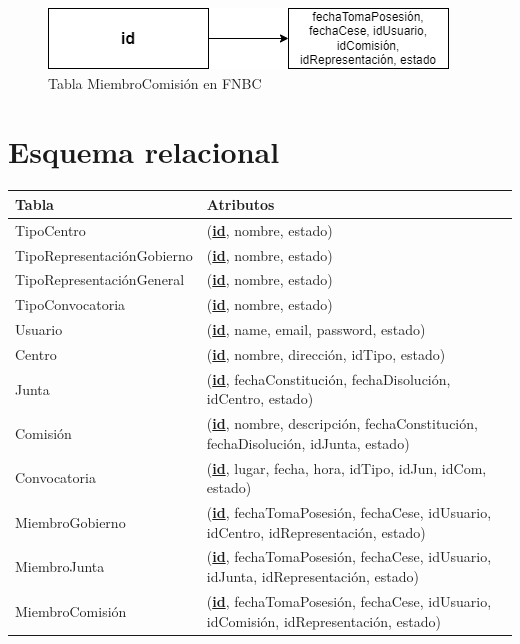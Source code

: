 \begin{figure}[H]
\centering
\includegraphics[scale=0.75]{img/diagramas/Datos/FNBC-MiembroComisión.png}
\caption{Tabla MiembroComisión en FNBC}\label{fig:Tabla MiembroComisión en FNBC}   
\end{figure}

 \section{Esquema relacional}\label{sec:esquema-relacional}

\begin{table}[H]
\begin{center}
    \begin{tabular}{|l|p{8cm}|}
    \hline
    Tabla                 &   Atributos          
    \\ \hline
    TipoCentro             &   (\textbf{\underline{id}}, nombre, estado) 
    \\  \hline
    TipoRepresentaciónGobierno          &   (\textbf{\underline{id}}, nombre, estado)
    \\  \hline
    TipoRepresentaciónGeneral             &   (\textbf{\underline{id}}, nombre, estado) 
    \\  \hline
    TipoConvocatoria             &   (\textbf{\underline{id}}, nombre, estado) 
    \\  \hline
    Usuario             &   (\textbf{\underline{id}}, name, email, password, estado) 
    \\  \hline
    Centro             &   (\textbf{\underline{id}}, nombre, dirección, idTipo, estado) 
    \\  \hline
    Junta             &   (\textbf{\underline{id}}, fechaConstitución, fechaDisolución, idCentro, estado) 
    \\  \hline
    Comisión             &    (\textbf{\underline{id}}, nombre, descripción, fechaConstitución, fechaDisolución, idJunta, estado) 
    \\  \hline
    Convocatoria             &    (\textbf{\underline{id}}, lugar, fecha, hora, idTipo, idJun, idCom, estado)
    \\  \hline
    MiembroGobierno             &   (\textbf{\underline{id}}, fechaTomaPosesión, fechaCese, idUsuario, idCentro, idRepresentación, estado) 
    \\  \hline
    MiembroJunta             &   (\textbf{\underline{id}}, fechaTomaPosesión, fechaCese, idUsuario, idJunta, idRepresentación, estado)
    \\  \hline
    MiembroComisión             &   (\textbf{\underline{id}}, fechaTomaPosesión, fechaCese, idUsuario, idComisión, idRepresentación, estado)
    \\  \hline
            \end{tabular}
        \end{center}
    \end{table}



